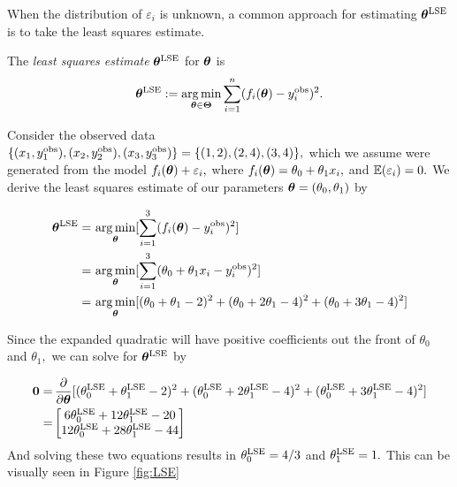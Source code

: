 When the distribution of $\varepsilon_i$ is unknown, a common approach for
estimating $\bm{\theta}^{\mathrm{LSE}}$ is to take the least squares estimate.

\begin{definition}
    The \emph{least squares estimate} $\bm{\theta}^{\mathrm{LSE}}$ for
    $\bm{\theta}$ is
    $$
        \bm{\theta}^{\mathrm{LSE}}
        := \operatorname*{arg\,min}_{\bm{\theta}\in\mathbf{\Theta}}
        \sum_{i = 1}^n (f_i(\bm{\theta})- y_i^{\mathrm{obs}})^2.
    $$
\end{definition}

\begin{example}\label{ex:LSE}
    Consider the observed data
    $\{(x_1, y_1^{\mathrm{obs}}), (x_2, y_2^{\mathrm{obs}}), (x_3, y_3^{\mathrm{obs}})\}
        = \{(1, 2), (2, 4), (3, 4)\},$
    which we assume were generated from the model
    $f_i(\bm{\theta}) + \varepsilon_i,$ where
    $f_i(\bm{\theta}) = \theta_0 + \theta_1x_i,$ and
    $\operatorname{\mathbb{E}}(\varepsilon_i) = 0.$ We derive the least squares estimate of our
    parameters $\bm{\theta} = (\theta_0, \theta_1)$ by

    \begin{align*}
        \bm{\theta}^{\mathrm{LSE}}
        = & \, \operatorname*{arg\,min}_{\bm{\theta}}
        [\sum_{i = 1}^3 (f_i(\bm{\theta}) - y_i^{\mathrm{obs}})^2]           \\
        = & \, \operatorname*{arg\,min}_{\bm{\theta}}
        [\sum_{i = 1}^3 (\theta_0 + \theta_1x_i - y_i^{\mathrm{obs}})^2] \\
        = & \, \operatorname*{arg\,min}_{\bm{\theta}}
        [(\theta_0 + \theta_1 - 2)^2 + (\theta_0 + 2\theta_1 - 4)^2
            + (\theta_0 + 3\theta_1 - 4)^2]
    \end{align*}

    Since the expanded quadratic will have positive coefficients out the front
    of $\theta_0$ and $\theta_1,$ we can solve for $\bm{\theta}^{\mathrm{LSE}}$
    by

    \begin{align*}
        \mathbf{0}
        = & \, \frac{\partial}{\partial \bm{\theta}}
        [
            (\theta^{\mathrm{LSE}}_0 + \theta^{\mathrm{LSE}}_1 - 2)^2
            + (\theta^{\mathrm{LSE}}_0 + 2\theta^{\mathrm{LSE}}_1 - 4)^2
            + (\theta^{\mathrm{LSE}}_0 + 3\theta^{\mathrm{LSE}}_1 - 4)^2
        ]                                        \\
        = & \begin{bmatrix}
                6\theta^{\mathrm{LSE}}_0 + 12\theta^{\mathrm{LSE}}_1 - 20 \\
                12\theta^{\mathrm{LSE}}_0 + 28\theta^{\mathrm{LSE}}_1 - 44
            \end{bmatrix}
    \end{align*}
    And solving these two equations results in $\theta^{\mathrm{LSE}}_0 = 4/3$ and
    $\theta^{\mathrm{LSE}}_1 = 1.$ This can be visually seen in Figure \ref{fig:LSE}
\end{example}


